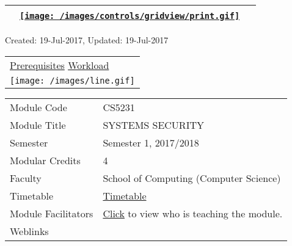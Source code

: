 \hypertarget{ctl00_ctl00_ContentPlaceHolder1_ContentPlaceHolder1_UP}{}
\hypertarget{contentstart}{}
\hypertarget{ctl00_ctl00_ContentPlaceHolder1_ContentPlaceHolder1_pnlMain}{}
\begin{longtable}[]{@{}ll@{}}
\toprule
&
{\href{javascript:PrintThisPage();}{\texttt{[image: /images/controls/gridview/print.gif]}}~~}\tabularnewline
\bottomrule
\end{longtable}

\protect\hypertarget{ctl00_ctl00_ContentPlaceHolder1_ContentPlaceHolder1_LV_UpdateInfo_ctrl0_txtDate}{}{Created:
19-Jul-2017, Updated: 19-Jul-2017}

\begin{longtable}[]{@{}l@{}}
\toprule
\protect\hypertarget{ctl00_ctl00_ContentPlaceHolder1_ContentPlaceHolder1_lblSectionTop}{}{\protect\hyperlink{Prerequisites}{Prerequisites}
\textbar{} \protect\hyperlink{Workload}{Workload}}\tabularnewline
\texttt{[image: /images/line.gif]}\tabularnewline
\bottomrule
\end{longtable}

\hypertarget{ctl00_ctl00_ContentPlaceHolder1_ContentPlaceHolder1_LV_itemPlaceholderContainer}{}
\begin{longtable}[]{@{}ll@{}}
\toprule
\protect\hypertarget{ctl00_ctl00_ContentPlaceHolder1_ContentPlaceHolder1_LV_ctrl0_txtCode}{}{Module
Code} &
\protect\hypertarget{ctl00_ctl00_ContentPlaceHolder1_ContentPlaceHolder1_LV_ctrl0_lcCode}{}{CS5231}\tabularnewline
\protect\hypertarget{ctl00_ctl00_ContentPlaceHolder1_ContentPlaceHolder1_LV_ctrl0_lcCourse}{}{Module
Title} &
\protect\hypertarget{ctl00_ctl00_ContentPlaceHolder1_ContentPlaceHolder1_LV_ctrl0_lcCourseName}{}{SYSTEMS
SECURITY}\tabularnewline
\protect\hypertarget{ctl00_ctl00_ContentPlaceHolder1_ContentPlaceHolder1_LV_ctrl0_lcSemester}{}{Semester}
&
\protect\hypertarget{ctl00_ctl00_ContentPlaceHolder1_ContentPlaceHolder1_LV_ctrl0_lcSem}{}{Semester
1, 2017/2018}\tabularnewline
\protect\hypertarget{ctl00_ctl00_ContentPlaceHolder1_ContentPlaceHolder1_LV_ctrl0_lcModCredit}{}{Modular
Credits} &
\protect\hypertarget{ctl00_ctl00_ContentPlaceHolder1_ContentPlaceHolder1_LV_ctrl0_lcModC}{}{4}\tabularnewline
\protect\hypertarget{ctl00_ctl00_ContentPlaceHolder1_ContentPlaceHolder1_LV_ctrl0_lcFaculty}{}{Faculty}
&
\protect\hypertarget{ctl00_ctl00_ContentPlaceHolder1_ContentPlaceHolder1_LV_ctrl0_lcFac}{}{School
of Computing (Computer Science)}\tabularnewline
\protect\hypertarget{ctl00_ctl00_ContentPlaceHolder1_ContentPlaceHolder1_LV_ctrl0_Label1}{}{Timetable}
&
\protect\hypertarget{ctl00_ctl00_ContentPlaceHolder1_ContentPlaceHolder1_LV_ctrl0_Span1}{}{\href{javascript:void(0);}{Timetable}}\tabularnewline
\protect\hypertarget{ctl00_ctl00_ContentPlaceHolder1_ContentPlaceHolder1_LV_ctrl0_Label6}{}{Module
Facilitators} &
\protect\hypertarget{ctl00_ctl00_ContentPlaceHolder1_ContentPlaceHolder1_LV_ctrl0_Span2}{}{\href{list_lecturers.aspx?CourseID=5ce9cfc8-7723-4eb2-b778-d47665e247db\&ClickFrom=}{Click}
to view who is teaching the module.}\tabularnewline
\protect\hypertarget{ctl00_ctl00_ContentPlaceHolder1_ContentPlaceHolder1_LV_ctrl0_LabelCtrl1}{}{Weblinks}
&\tabularnewline
\bottomrule
\end{longtable}

